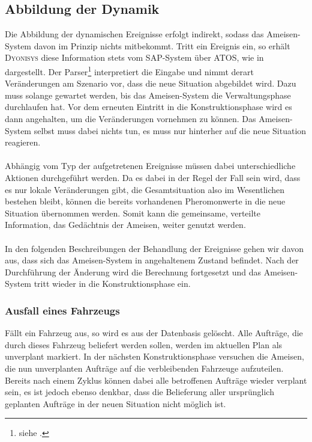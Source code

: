 \subsection{Abbildung der Dynamik}
Die Abbildung der dynamischen Ereignisse erfolgt indirekt, sodass das Ameisen-System davon im Prinzip nichts mitbekommt. Tritt ein Ereignis ein, so erhält \textsc{Dyonisys} diese Information stets vom SAP-System über \textsc{ATOS}, wie in  dargestellt. Der Parser\footnote{siehe .} interpretiert die Eingabe und nimmt derart Veränderungen am Szenario vor, dass die neue Situation abgebildet wird. Dazu muss solange gewartet werden, bis das Ameisen-System die Verwaltungsphase durchlaufen hat. Vor dem erneuten Eintritt in die Konstruktionsphase wird es dann angehalten, um die Veränderungen vornehmen zu können. Das Ameisen-System selbst muss dabei nichts tun, es muss nur hinterher auf die neue Situation reagieren. \\
\\
Abhängig vom Typ der aufgetretenen Ereignisse müssen dabei unterschiedliche Aktionen durchgeführt werden. Da es dabei in der Regel der Fall sein wird, dass es nur lokale Veränderungen gibt, die Gesamtsituation also im Wesentlichen bestehen bleibt, können die bereits vorhandenen Pheromonwerte in die neue Situation übernommen werden. Somit kann die gemeinsame, verteilte Information, das Gedächtnis der Ameisen, weiter genutzt werden. \\
\\
In den folgenden Beschreibungen der Behandlung der Ereignisse gehen wir davon aus, dass sich das Ameisen-System in angehaltenem Zustand befindet. Nach der Durchführung der Änderung wird die Berechnung fortgesetzt und das Ameisen-System tritt wieder in die Konstruktionsphase ein.


\subsubsection{Ausfall eines Fahrzeugs}
Fällt ein Fahrzeug aus, so wird es aus der Datenbasis gelöscht. Alle Aufträge, die durch dieses Fahrzeug beliefert werden sollen, werden im aktuellen Plan als unverplant markiert. In der nächsten Konstruktionsphase versuchen die Ameisen, die nun unverplanten Aufträge auf die verbleibenden Fahrzeuge aufzuteilen. Bereits nach einem Zyklus können dabei alle betroffenen Aufträge wieder verplant sein, es ist jedoch ebenso denkbar, dass die Belieferung aller ursprünglich geplanten Aufträge in der neuen Situation nicht möglich ist.


